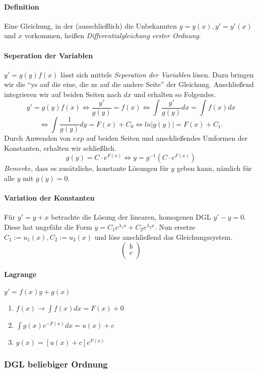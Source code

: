 \documentclass[a4paper, 9pt, DIV=24]{scrartcl}
\begin{document}
\paragraph{Definition}
Eine Gleichung, in der (ausschließlich) die Unbekannten $y = y(x), y' = y'(x)$ und $x$ vorkommen, heißen \emph{Differentialgleichung erster Ordnung}.
\paragraph{Seperation der Variablen}
$y' = g(y)f(x)$ lässt sich mittels \emph{Seperation der Variablen} lösen.
Dazu bringen wir die ``ys auf die eine, die xs auf die andere Seite'' der Gleichung.
Anschließend integrieren wir auf beiden Seiten nach $dx$ und erhalten so Folgendes.
\[ y' = g(y)f(x) \iff \frac{y'}{g(y)} = f(x) \iff \int\frac{y'}{g(y)}dx = \int f(x)dx \]
\[ \iff \int\frac{1}{g(y)}dy = F(x) + C_0 \iff ln |g(y)| = F(x) + C_1. \]
Durch Anwenden von $exp$ auf beiden Seiten und anschließendes Umformen der Konstanten, erhalten wir schließlich.
\[ g(y) = C\cdot e^{F(x)} \iff y = g^{-1}(C\cdot e^{F(x)}) \]
\emph{Bemerke,} dass es zusätzliche, konstante Lösungen für $y$ geben kann, nämlich für alle $y$ mit $g(y) = 0$.

\paragraph{Variation der Konstanten}
Für $y' = y + x$ betrachte die Lösung der linearen, homogenen DGL $y' - y = 0$. Diese hat ungefähr die Form $y = C_1 e^{\lambda_1 x} + C_2 e^{\lambda_2 x}$.
Nun ersetze $C_1 := u_1(x), C_2 := u_2(x)$ und löse anschließend das Gleichungssystem.
\[
\begin{pmatrix}
 b \\ c \\
\end{pmatrix}
\]

\paragraph{Lagrange}
$y'=f(x)y+g(x)$
\begin{enumerate}
\item $f(x) \rightarrow \int f(x)dx=F(x)+0$
\item $\int g(x)e^{-F(x)}dx=u(x)+c$
\item $y(x)=\left[u(x)+c\right]e^{F(x)}$
\end{enumerate}

\subsubsection{DGL beliebiger Ordnung}
\end{document}
